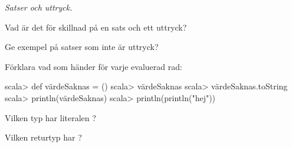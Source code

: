 \begin{ConceptConnections}[0.3\textwidth]

\end{ConceptConnections}

\SOLUTION

\TaskSolved \what

\begin{ConceptConnections}

\end{ConceptConnections}

%
%
%
%
%
%
%
%
%
%
%
%
%
%
%
%
%
%
%
%
%
%
%
%


\QUESTEND




\def\what{\emph{Satser och uttryck.}}

\QUESTBEGIN

\Task \what

\Subtask Vad är det för skillnad på en sats och ett uttryck?

\Subtask Ge exempel på satser som inte är uttryck?

\Subtask Förklara vad som händer för varje evaluerad rad:
\begin{REPL}
scala> def värdeSaknas = ()
scala> värdeSaknas
scala> värdeSaknas.toString
scala> println(värdeSaknas)
scala> println(println("hej"))
\end{REPL}

\Subtask Vilken typ har literalen \code{()}?

\Subtask Vilken returtyp har ?

\SOLUTION

